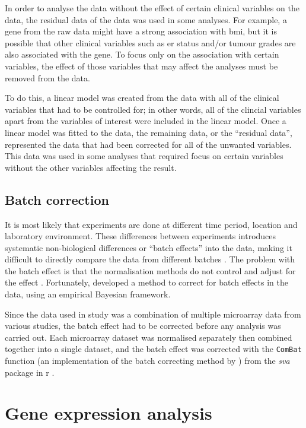 In order to analyse the data without the effect of certain clinical variables on the data, the residual data of the data was used in some analyses.
For example, a gene from the raw data might have a strong association with \gls{bmi}, but it is possible that other clinical variables such as \gls{er} status and/or tumour grades are also associated with the gene.
To focus only on the association with certain variables, the effect of those variables that may affect the analyses must be removed from the data.

To do this, a linear model was created from the data with all of the clinical variables that had to be controlled for; in other words, all of the clincial variables apart from the variables of interest were included in the linear model.
Once a linear model was fitted to the data, the remaining data, or the ``residual data'', represented the data that had been corrected for all of the unwanted variables.
This data was used in some analyses that required focus on certain variables without the other variables affecting the result.

\subsection{Batch correction}
\label{sub:batch_correction}

It is most likely that experiments are done at different time period, location and laboratory environment.
These differences between experiments introduces systematic non-biological differences or ``batch effects'' into the data, making it difficult to directly compare the data from different batches \citep{Johnson2007}.
The problem with the batch effect is that the normalisation methods do not control and adjust for the effect \citep{Johnson2007}.
Fortunately, \citet{Johnson2007} developed a method to correct for batch effects in the data, using an empirical Bayesian framework.

Since the data used in \citet{Gatza2010a} study was a combination of multiple microarray data from various studies, the batch effect had to be corrected before any analysis was carried out.
Each microarray dataset was normalised separately then combined together into a single dataset, and the batch effect was corrected with the \texttt{ComBat} function (an implementation of the batch correcting method by \citet{Johnson2007}) from the \textit{sva} package in \gls{r} \citep{Leek2012}.

\section{Gene expression analysis}
\label{sec:gene_expression_analysis}

